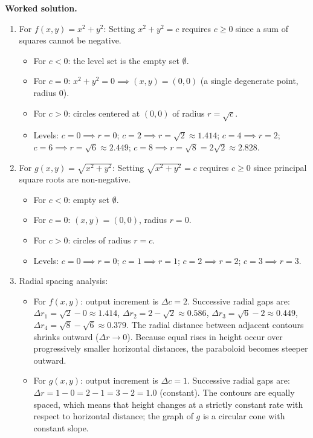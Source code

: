 \documentclass[11pt,letterpaper]{article}
\begin{document}
\textbf{Worked solution.}
\begin{enumerate}[label=(\alph*),leftmargin=*]
    \item For $f(x,y) = x^2 + y^2$:
    Setting $x^2 + y^2 = c$ requires $c \ge 0$ since a sum of squares cannot be negative.
    \begin{itemize}[nosep]
        \item For $c < 0$: the level set is the empty set $\emptyset$.
        \item For $c = 0$: $x^2+y^2=0 \implies (x,y)=(0,0)$ (a single degenerate point, radius $0$).
        \item For $c > 0$: circles centered at $(0,0)$ of radius $r = \sqrt{c}$.
        \item Levels: $c=0 \implies r = 0$; $c=2 \implies r = \sqrt{2} \approx 1.414$; $c=4 \implies r = 2$; $c=6 \implies r = \sqrt{6} \approx 2.449$; $c=8 \implies r = \sqrt{8} = 2\sqrt{2} \approx 2.828$.
    \end{itemize}
    \item For $g(x,y) = \sqrt{x^2 + y^2}$:
    Setting $\sqrt{x^2+y^2} = c$ requires $c \ge 0$ since principal square roots are non-negative.
    \begin{itemize}[nosep]
        \item For $c < 0$: empty set $\emptyset$.
        \item For $c = 0$: $(x,y)=(0,0)$, radius $r = 0$.
        \item For $c > 0$: circles of radius $r = c$.
        \item Levels: $c=0 \implies r = 0$; $c=1 \implies r = 1$; $c=2 \implies r = 2$; $c=3 \implies r = 3$.
    \end{itemize}
    \item Radial spacing analysis:
    \begin{itemize}[nosep]
        \item For $f(x,y)$: output increment is $\Delta c = 2$. Successive radial gaps are:
        $\Delta r_1 = \sqrt{2} - 0 \approx 1.414$,
        $\Delta r_2 = 2 - \sqrt{2} \approx 0.586$,
        $\Delta r_3 = \sqrt{6} - 2 \approx 0.449$,
        $\Delta r_4 = \sqrt{8} - \sqrt{6} \approx 0.379$.
        The radial distance between adjacent contours shrinks outward ($\Delta r \to 0$). Because equal rises in height occur over progressively smaller horizontal distances, the paraboloid becomes steeper outward.
        \item For $g(x,y)$: output increment is $\Delta c = 1$. Successive radial gaps are:
        $\Delta r = 1 - 0 = 2 - 1 = 3 - 2 = 1.0$ (constant).
        The contours are equally spaced, which means that height changes at a strictly constant rate with respect to horizontal distance; the graph of $g$ is a circular cone with constant slope.
    \end{itemize}
\end{enumerate}
\end{document}
